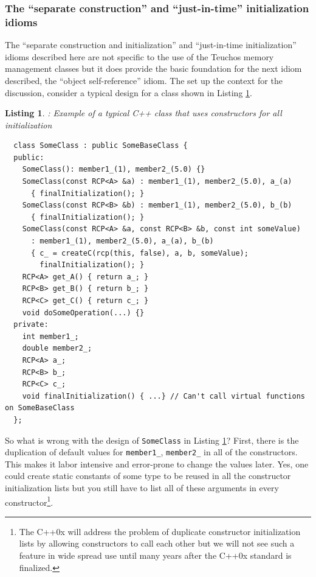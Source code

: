 \documentclass[pdf,ps2pdf,11pt]{SANDreport}
\newtheorem{listing}{Listing}
\begin{document}
%
{}\subsubsection{The ``separate construction'' and ``just-in-time''
initialization idioms}
\label{sec:separate-construct-init}
%

The ``separate construction and initialization'' and ``just-in-time
initialization'' idioms described here are not specific to the use of
the Teuchos memory management classes but it does provide the basic
foundation for the next idiom described, the ``object self-reference''
idiom.  The set up the context for the discussion, consider a typical
design for a class shown in Listing
{}\ref{listing:sci:SomeClass-before}.


\begin{listing}: Example of a typical C++ class that uses constructors for all
initialization  \\
\label{listing:sci:SomeClass-before}
{\small\begin{verbatim}
  class SomeClass : public SomeBaseClass {
  public:
    SomeClass(): member1_(1), member2_(5.0) {}
    SomeClass(const RCP<A> &a) : member1_(1), member2_(5.0), a_(a)
      { finalInitialization(); }
    SomeClass(const RCP<B> &b) : member1_(1), member2_(5.0), b_(b)
      { finalInitialization(); }
    SomeClass(const RCP<A> &a, const RCP<B> &b, const int someValue)
      : member1_(1), member2_(5.0), a_(a), b_(b)
      { c_ = createC(rcp(this, false), a, b, someValue);
        finalInitialization(); }
    RCP<A> get_A() { return a_; }
    RCP<B> get_B() { return b_; }
    RCP<C> get_C() { return c_; }
    void doSomeOperation(...) {}
  private:
    int member1_;
    double member2_;
    RCP<A> a_;
    RCP<B> b_;
    RCP<C> c_;
    void finalInitialization() { ...} // Can't call virtual functions on SomeBaseClass
  };

\end{verbatim}}
\end{listing}


So what is wrong with the design of {}\texttt{SomeClass} in Listing
{}\ref{listing:sci:SomeClass-before}?  First, there is the duplication
of default values for {}\texttt{member1\_}, {}\texttt{member2\_} in
all of the constructors.  This makes it labor intensive and
error-prone to change the values later.  Yes, one could create static
constants of some type to be reused in all the constructor
initialization lists but you still have to list all of these arguments
in every constructor\footnote{The C++0x will address the problem of
duplicate constructor initialization lists by allowing constructors to
call each other but we will not see such a feature in wide spread use
until many years after the C++0x standard is finalized.}.
\end{document}
